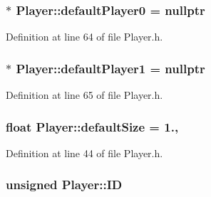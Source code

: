 \hypertarget{class_player_a13d309a31f4fc49b249ed471c610661c}{
\subsubsection[{default\-Player0}]{ $\ast$ Player\-::default\-Player0 = nullptr\hspace{0.3cm}{\ttfamily [static]}}}\label{class_player_a13d309a31f4fc49b249ed471c610661c}


Definition at line 64 of file Player.\-h.

\hypertarget{class_player_aff6bf1fbf9a588c0b89ec3375720b80e}{
\subsubsection[{default\-Player1}]{ $\ast$ Player\-::default\-Player1 = nullptr\hspace{0.3cm}{\ttfamily [static]}}}\label{class_player_aff6bf1fbf9a588c0b89ec3375720b80e}


Definition at line 65 of file Player.\-h.

\hypertarget{class_player_a0256732894e9abefda92d93220366cc3}{
\subsubsection[{default\-Size}]{\setlength{\rightskip}{0pt plus 5cm}float Player\-::default\-Size = 1.\hspace{0.3cm}{\ttfamily [static]}, {\ttfamily [protected]}}}\label{class_player_a0256732894e9abefda92d93220366cc3}


Definition at line 44 of file Player.\-h.

\hypertarget{class_player_a681c4a2c3b35c7e071cde859fb8ed167}{
\subsubsection[{I\-D}]{\setlength{\rightskip}{0pt plus 5cm}unsigned Player\-::\-I\-D\hspace{0.3cm}{\ttfamily [protected]}}}\label{class_player_a681c4a2c3b35c7e071cde859fb8ed167}


